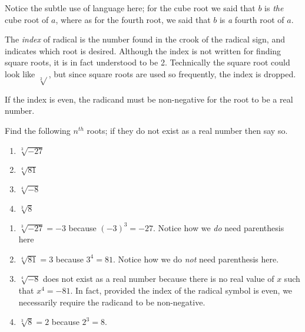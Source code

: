 Notice the subtle use of language here; for the cube root we said that $b$ is {\em the} cube root of $a$, where
as for the fourth root, we said that $b$ is  {\em a } fourth root of $a$.

The {\em index} of radical is the number found in the crook of the radical sign, and indicates which root is
desired. Although the index is not written for finding square roots, it is in fact understood to 
be 2. Technically the square root could look like $\sqrt[2]{}$, but since square roots are used so frequently, 
the index is dropped. 

If the index is even, the radicand must be non-negative for the root to be a real number.

\begin{myexample}
Find the following $n^{th}$ roots; if they do not exist as a real number then say so.
\begin{multicols}{4}
	\begin{enumerate}
		\item $\sqrt[3]{-27}$
		\item $\sqrt[4]{81}$
		\item $\sqrt[4]{-8}$
		\item $\sqrt[3]{8}$
	\end{enumerate}
\end{multicols}
{}
\end{myexample}
\begin{myProof}
	\begin{enumerate}
		\item $\sqrt[3]{-27} = -3$ because $(-3)^3 = -27$. Notice how we {\em do} need parenthesis here
		\item $\sqrt[4]{81} = 3$ because $3^4 = 81$. Notice how we do {\em not} need parenthesis here.
		\item $\sqrt[4]{-8}$ does not exist as a real number because there is no real value of $x$ such that $x^4 = -81$. In fact, provided the
		index of the radical symbol is even, we necessarily require the radicand to be non-negative.
		\item $\sqrt[3]{8} = 2$ because $2^3 = 8$.
	\end{enumerate}
	{}
\end{myProof}


